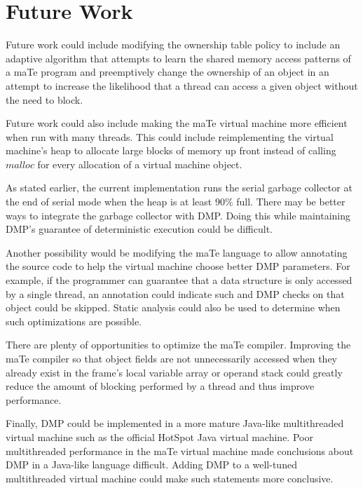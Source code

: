\section{Future Work}

Future work could include modifying the ownership table policy to
include an adaptive algorithm that attempts to learn the shared memory
access patterns of a maTe program and preemptively change the
ownership of an object in an attempt to increase the likelihood that a
thread can access a given object without the need to block.

Future work could also include making the maTe virtual machine more
efficient when run with many threads.  This could include
reimplementing the virtual machine's heap to allocate large blocks of
memory up front instead of calling $malloc$ for every allocation of a
virtual machine object.

As stated earlier, the current implementation runs the serial garbage
collector at the end of serial mode when the heap is at least $90\%$
full.  There may be better ways to integrate the garbage collector
with DMP.  Doing this while maintaining DMP's guarantee of
deterministic execution could be difficult.

Another possibility would be modifying the maTe language to allow
annotating the source code to help the virtual machine choose better
DMP parameters.  For example, if the programmer can guarantee that a
data structure is only accessed by a single thread, an annotation
could indicate such and DMP checks on that object could be skipped.
Static analysis could also be used to determine when such
optimizations are possible.

There are plenty of opportunities to optimize the maTe compiler.
Improving the maTe compiler so that object fields are not
unnecessarily accessed when they already exist in the frame's local
variable array or operand stack could greatly reduce the amount of
blocking performed by a thread and thus improve performance.

Finally, DMP could be implemented in a more mature Java-like
multithreaded virtual machine such as the official HotSpot Java
virtual machine.  Poor multithreaded performance in the maTe virtual
machine made conclusions about DMP in a Java-like language difficult.
Adding DMP to a well-tuned multithreaded virtual machine could make
such statements more conclusive.

